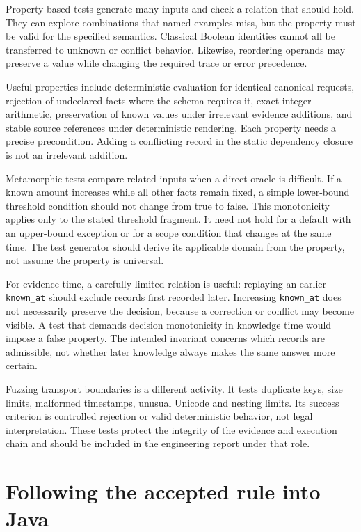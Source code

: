 Property-based tests generate many inputs and check a relation that should hold.
They can explore combinations that named examples miss, but the property must
be valid for the specified semantics. Classical Boolean identities cannot all be
transferred to unknown or conflict behavior. Likewise, reordering operands may
preserve a value while changing the required trace or error precedence.

Useful properties include deterministic evaluation for identical canonical
requests, rejection of undeclared facts where the schema requires it, exact
integer arithmetic, preservation of known values under irrelevant evidence
additions, and stable source references under deterministic rendering. Each
property needs a precise precondition. Adding a conflicting record in the static
dependency closure is not an irrelevant addition.


Metamorphic tests compare related inputs when a direct oracle is difficult. If a
known amount increases while all other facts remain fixed, a simple lower-bound
threshold condition should not change from true to false. This monotonicity
applies only to the stated threshold fragment. It need not hold for a default
with an upper-bound exception or for a scope condition that changes at the same
time. The test generator should derive its applicable domain from the property,
not assume the property is universal.

For evidence time, a carefully limited relation is useful: replaying an earlier
\texttt{known\_at} should exclude records first recorded later. Increasing
\texttt{known\_at} does not necessarily preserve the decision, because a correction
or conflict may become visible. A test that demands decision monotonicity in
knowledge time would impose a false property. The intended invariant concerns
which records are admissible, not whether later knowledge always makes the same
answer more certain.

Fuzzing transport boundaries is a different activity. It tests duplicate keys,
size limits, malformed timestamps, unusual Unicode and nesting limits. Its
success criterion is controlled rejection or valid deterministic behavior, not
legal interpretation. These tests protect the integrity of the evidence and
execution chain and should be included in the engineering report under that role.

\section{Following the accepted rule into Java}
\label{sec:reader-java}

